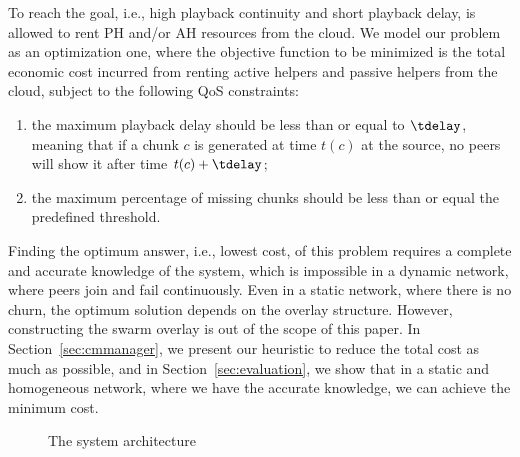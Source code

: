 To reach the \clive goal, i.e., high playback continuity and short playback delay, \clive is allowed to rent 
PH and/or AH resources from the cloud. 
We model our problem as an optimization one, where the objective function to be minimized is the total economic cost incurred from renting active helpers and passive helpers from the cloud, subject to the following QoS constraints:
\begin{enumerate}
\item the maximum playback delay should be less than or equal to $\tdelay$,
meaning that if a chunk $c$ is generated at time $t(c)$ at the source, no
peers will show it after time $t(c)+\tdelay$;
\item the maximum percentage of missing chunks should be less than or equal the predefined threshold.
\end{enumerate}

Finding the optimum answer, i.e., lowest cost, of this problem requires a complete and accurate knowledge of the system, which is impossible in a dynamic network, where peers join and fail continuously. Even in a static network, where there is no churn, the optimum solution depends on the overlay structure. However, constructing the swarm overlay is out of the scope of this paper. In Section~\ref{sec:cmmanager}, we present our heuristic to reduce the total cost as much as possible, and in Section~\ref{sec:evaluation}, we show that in a static and homogeneous network, where we have the accurate knowledge, we can achieve the minimum cost.

\begin{figure}[t]
\centering
{}
\caption{\small The system architecture}\label{fig:arch}
\end{figure}


